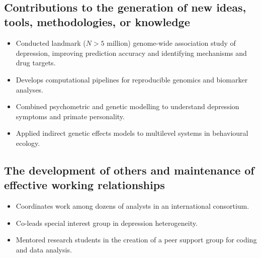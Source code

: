 \documentclass[11pt]{article}
\begin{document}

\noindent{\rule{\textwidth}{1pt}} \\


\subsection*{Contributions to the generation of new ideas, tools, methodologies, or knowledge}

\begin{itemize}
  \item Conducted landmark ($N > 5$ million) genome-wide association study of depression, improving prediction accuracy and identifying mechanisms and drug targets.
  \item Develops computational pipelines for reproducible genomics and biomarker analyses.
  \item Combined psychometric and genetic modelling to understand depression symptoms and primate personality.
  \item Applied indirect genetic effects models to multilevel systems in behavioural ecology.
\end{itemize}

\subsection*{The development of others and maintenance of effective working relationships}

\begin{itemize}
  \item Coordinates work among dozens of analysts in an international consortium.
  \item Co-leads special interest group in depression heterogeneity.
  \item Mentored research students in the creation of a peer support group for coding and data analysis.
\end{itemize}
\end{document}
